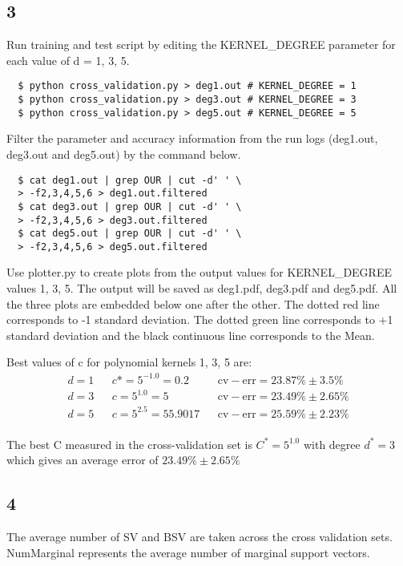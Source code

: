 \documentclass{article}
\begin{document}
\subsection*{3}
Run training and test script\cite{cvscript} by editing the KERNEL\_DEGREE parameter for each value of d = 1, 3, 5.
\begin{lstlisting}
  $ python cross_validation.py > deg1.out # KERNEL_DEGREE = 1
  $ python cross_validation.py > deg3.out # KERNEL_DEGREE = 3
  $ python cross_validation.py > deg5.out # KERNEL_DEGREE = 5
\end{lstlisting}

Filter the parameter and accuracy information from the run logs (deg1.out, deg3.out and deg5.out) by the command below.
\begin{lstlisting}
  $ cat deg1.out | grep OUR | cut -d' ' \
  > -f2,3,4,5,6 > deg1.out.filtered
  $ cat deg3.out | grep OUR | cut -d' ' \
  > -f2,3,4,5,6 > deg3.out.filtered
  $ cat deg5.out | grep OUR | cut -d' ' \
  > -f2,3,4,5,6 > deg5.out.filtered
\end{lstlisting}

Use plotter.py\cite{plotterpy} to create plots from the output values for KERNEL\_DEGREE values 1, 3, 5.  The output will be saved as deg1.pdf, deg3.pdf and deg5.pdf.  All the three plots are embedded below one after the other.  The dotted red line corresponds to -1 standard deviation.  The dotted green line corresponds to +1 standard deviation and the black continuous line corresponds to the Mean.




Best values of c for polynomial kernels 1, 3, 5 are:
\begin{align*}
  d = 1 && c* = 5^{-1.0} = 0.2 && \mathrm{cv-err} = 23.87\% \pm 3.5\% \\
  d = 3 && c = 5^{1.0} = 5 && \mathrm{cv-err} = 23.49\% \pm 2.65\%\\
  d = 5 && c = 5^{2.5} = 55.9017 && \mathrm{cv-err} = 25.59\% \pm 2.23\% \\
\end{align*}

The best C measured in the cross-validation set is \( C^{*} = 5^{1.0} \) with degree \( d^{*} = 3 \) which gives an average error of \( 23.49\% \pm 2.65\% \)

\subsection*{4}
The average number of SV and BSV are taken across the cross validation sets.  NumMarginal represents the average number of marginal support vectors.
\end{document}
